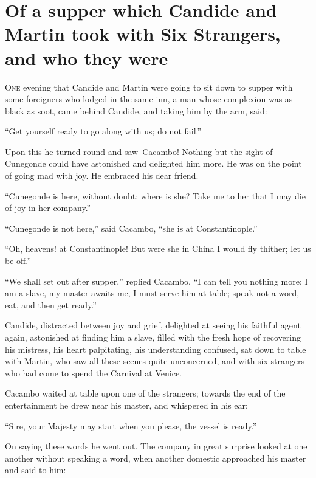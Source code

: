 \vspace{1cm}
\begingroup
\let\clearpage\relax
\chapter{Of a supper which Candide and Martin took with Six Strangers, and who they were}
\thispagestyle{pter}
\endgroup
\vspace{-1cm}
\lettrine[lraise=0.1,nindent=0em,slope=-.5em]{O}{ne} evening that Candide and Martin were going to sit down to supper with some foreigners who lodged in the same inn, a man whose complexion was as black as soot, came behind Candide, and taking him by the arm, said:

``Get yourself ready to go along with us; do not fail.''

Upon this he turned round and saw--Cacambo! Nothing but the sight of Cunegonde could have astonished and delighted him more. He was on the point of going mad with joy. He embraced his dear friend.

``Cunegonde is here, without doubt; where is she? Take me to her that I may die of joy in her company.''

``Cunegonde is not here,'' said Cacambo, ``she is at Constantinople.''

``Oh, heavens! at Constantinople! But were she in China I would fly thither; let us be off.''

``We shall set out after supper,'' replied Cacambo. ``I can tell you nothing more; I am a slave, my master awaits me, I must serve him at table; speak not a word, eat, and then get ready.''

Candide, distracted between joy and grief, delighted at seeing his faithful agent again, astonished at finding him a slave, filled with the fresh hope of recovering his mistress, his heart palpitating, his understanding confused, sat down to table with Martin, who saw all these scenes quite unconcerned, and with six strangers who had come to spend the Carnival at Venice.

Cacambo waited at table upon one of the strangers; towards the end of the entertainment he drew near his master, and whispered in his ear:

``Sire, your Majesty may start when you please, the vessel is ready.''

On saying these words he went out. The company in great surprise looked at one another without speaking a word, when another domestic approached his master and said to him:

